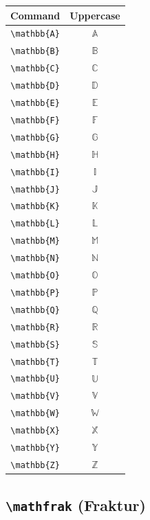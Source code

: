 \documentclass[12pt,a4paper]{article}
\begin{document}
\begin{longtable}{|c|c|}
\hline
\textbf{Command} & \textbf{Uppercase} \\
\hline
\verb|\mathbb{A}| & $\mathbb{A}$ \\ %
\verb|\mathbb{B}| & $\mathbb{B}$ \\ %
\verb|\mathbb{C}| & $\mathbb{C}$ \\ %
\verb|\mathbb{D}| & $\mathbb{D}$ \\ %
\verb|\mathbb{E}| & $\mathbb{E}$ \\ %
\verb|\mathbb{F}| & $\mathbb{F}$ \\ %
\verb|\mathbb{G}| & $\mathbb{G}$ \\ %
\verb|\mathbb{H}| & $\mathbb{H}$ \\ %
\verb|\mathbb{I}| & $\mathbb{I}$ \\ %
\verb|\mathbb{J}| & $\mathbb{J}$ \\ %
\verb|\mathbb{K}| & $\mathbb{K}$ \\ %
\verb|\mathbb{L}| & $\mathbb{L}$ \\ %
\verb|\mathbb{M}| & $\mathbb{M}$ \\ %
\verb|\mathbb{N}| & $\mathbb{N}$ \\ %
\verb|\mathbb{O}| & $\mathbb{O}$ \\ %
\verb|\mathbb{P}| & $\mathbb{P}$ \\ %
\verb|\mathbb{Q}| & $\mathbb{Q}$ \\ %
\verb|\mathbb{R}| & $\mathbb{R}$ \\ %
\verb|\mathbb{S}| & $\mathbb{S}$ \\ %
\verb|\mathbb{T}| & $\mathbb{T}$ \\ %
\verb|\mathbb{U}| & $\mathbb{U}$ \\ %
\verb|\mathbb{V}| & $\mathbb{V}$ \\ %
\verb|\mathbb{W}| & $\mathbb{W}$ \\ %
\verb|\mathbb{X}| & $\mathbb{X}$ \\ %
\verb|\mathbb{Y}| & $\mathbb{Y}$ \\ %
\verb|\mathbb{Z}| & $\mathbb{Z}$ \\ %

\hline
\end{longtable}

\newpage

\subsection*{\texttt{\textbackslash{}mathfrak} (Fraktur)}
\end{document}

